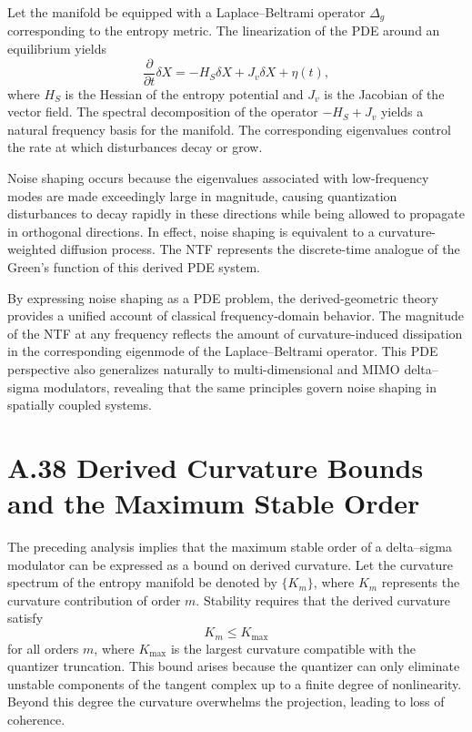 Let the manifold be equipped with a Laplace–Beltrami operator \(\Delta_g\) corresponding to the entropy metric. The linearization of the PDE around an equilibrium yields
\[
\frac{\partial}{\partial t} \delta X = - H_S \delta X + J_v \delta X + \eta(t),
\]
where \(H_S\) is the Hessian of the entropy potential and \(J_v\) is the Jacobian of the vector field. The spectral decomposition of the operator \(-H_S + J_v\) yields a natural frequency basis for the manifold. The corresponding eigenvalues control the rate at which disturbances decay or grow.

Noise shaping occurs because the eigenvalues associated with low-frequency modes are made exceedingly large in magnitude, causing quantization disturbances to decay rapidly in these directions while being allowed to propagate in orthogonal directions. In effect, noise shaping is equivalent to a curvature-weighted diffusion process. The NTF represents the discrete-time analogue of the Green’s function of this derived PDE system.

By expressing noise shaping as a PDE problem, the derived-geometric theory provides a unified account of classical frequency-domain behavior. The magnitude of the NTF at any frequency reflects the amount of curvature-induced dissipation in the corresponding eigenmode of the Laplace–Beltrami operator. This PDE perspective also generalizes naturally to multi-dimensional and MIMO delta–sigma modulators, revealing that the same principles govern noise shaping in spatially coupled systems.

\section{A.38 Derived Curvature Bounds and the Maximum Stable Order}

The preceding analysis implies that the maximum stable order of a delta–sigma modulator can be expressed as a bound on derived curvature. Let the curvature spectrum of the entropy manifold be denoted by \(\{K_m\}\), where \(K_m\) represents the curvature contribution of order \(m\). Stability requires that the derived curvature satisfy
\[
K_m \le K_{\mathrm{max}}
\]
for all orders \(m\), where \(K_{\mathrm{max}}\) is the largest curvature compatible with the quantizer truncation. This bound arises because the quantizer can only eliminate unstable components of the tangent complex up to a finite degree of nonlinearity. Beyond this degree the curvature overwhelms the projection, leading to loss of coherence.

